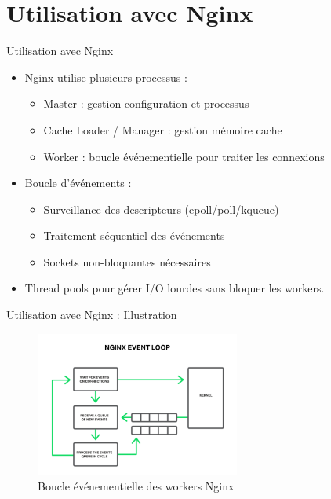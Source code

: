 \documentclass[aspectratio=43,8pt]{beamer}
\begin{document}
\section{Utilisation avec Nginx}
\begin{frame}{Utilisation avec Nginx}
\begin{card}
    \begin{itemize}
        \item Nginx utilise plusieurs processus :
        \begin{itemize}
            \item Master : gestion configuration et processus
            \item Cache Loader / Manager : gestion mémoire cache
            \item Worker : boucle événementielle pour traiter les connexions
        \end{itemize}
        \item Boucle d’événements :
        \begin{itemize}
            \item Surveillance des descripteurs (epoll/poll/kqueue)
            \item Traitement séquentiel des événements
            \item Sockets non-bloquantes nécessaires
        \end{itemize}
        \item Thread pools pour gérer I/O lourdes sans bloquer les workers.
    \end{itemize}
\end {card}
\end{frame}

\begin{frame}{Utilisation avec Nginx : Illustration}
    \begin{figure}
        \centering
        \includegraphics[width=0.6\textwidth]{img2/nginx-event-Loop.png}
        \caption{Boucle événementielle des workers Nginx}
    \end{figure}
\end{frame}
\end{document}
